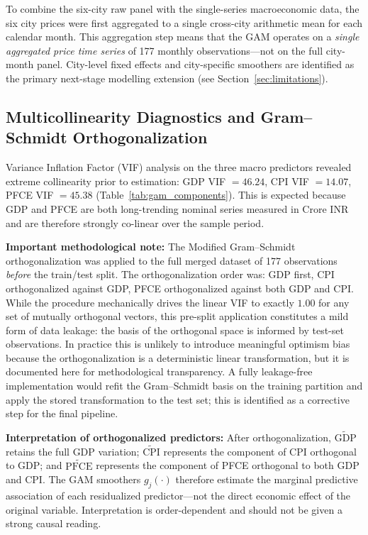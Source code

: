 \documentclass[11pt,a4paper]{article}
\begin{document}
To combine the six-city raw panel with the single-series macroeconomic data,
the six city prices were first aggregated to a single cross-city arithmetic
mean for each calendar month.  This aggregation step means that the GAM
operates on a \emph{single aggregated price time series} of 177 monthly
observations---not on the full city-month panel.  City-level fixed effects
and city-specific smoothers are identified as the primary next-stage modelling
extension (see Section~\ref{sec:limitations}).

\subsection{Multicollinearity Diagnostics and Gram--Schmidt Orthogonalization}

Variance Inflation Factor (VIF) analysis on the three macro predictors revealed
extreme collinearity prior to estimation: GDP VIF $= 46.24$, CPI VIF $= 14.07$,
PFCE VIF $= 45.38$ (Table~\ref{tab:gam_components}).  This is expected because
GDP and PFCE are both long-trending nominal series measured in Crore INR and
are therefore strongly co-linear over the sample period.

\textbf{Important methodological note:} The Modified Gram--Schmidt
orthogonalization was applied to the full merged dataset of 177 observations
\emph{before} the train/test split.  The orthogonalization order was: GDP
first, CPI orthogonalized against GDP, PFCE orthogonalized against both GDP
and CPI.  While the procedure mechanically drives the linear VIF to exactly
$1.00$ for any set of mutually orthogonal vectors, this pre-split application
constitutes a mild form of data leakage: the basis of the orthogonal space is
informed by test-set observations.  In practice this is unlikely to introduce
meaningful optimism bias because the orthogonalization is a deterministic linear
transformation, but it is documented here for methodological transparency.
A fully leakage-free implementation would refit the Gram--Schmidt basis on the
training partition and apply the stored transformation to the test set; this is
identified as a corrective step for the final pipeline.

\textbf{Interpretation of orthogonalized predictors:} After orthogonalization,
$\widetilde{\mathrm{GDP}}$ retains the full GDP variation; $\widetilde{\mathrm{CPI}}$
represents the component of CPI orthogonal to GDP; and
$\widetilde{\mathrm{PFCE}}$ represents the component of PFCE orthogonal to
both GDP and CPI.  The GAM smoothers $g_j(\cdot)$ therefore estimate the
marginal predictive association of each residualized predictor---not the direct
economic effect of the original variable.  Interpretation is order-dependent
and should not be given a strong causal reading.
\end{document}
